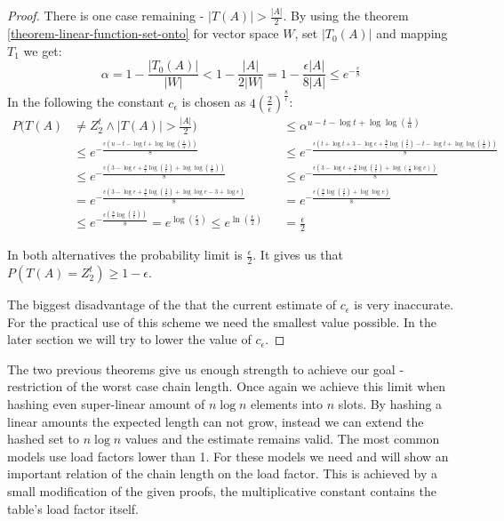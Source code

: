 \begin{proof}
There is one case remaining - $|T(A)| > \frac{|A|}{2}$. By using the theorem \ref{theorem-linear-function-set-onto} for vector space $W$, set $|T_0(A)|$ and mapping $T_1$ we get:
\begin{displaymath}
\alpha = 1 - \frac{|T_0(A)|}{|W|} < 1 - \frac{|A|}{2|W|} = 1 - \frac{\epsilon |A|}{8|A|} \leq e^{-\frac{\epsilon}{8}}
\end{displaymath}
In the following the constant $c_\epsilon$ is chosen as $4\left(\frac{2}{\epsilon}\right)^{\frac{8}{\epsilon}}$:
\begin{align*}
P(T(A) & \neq Z_2^t \wedge |T(A)| > \frac{|A|}{2}) && \leq \alpha ^ {u - t - \log t + \log\log\left(\frac{1}{\alpha}\right)} \\
    & \leq e^{-\frac{\epsilon\left(u - t - \log t + \log\log\left(\frac{1}{\alpha}\right)\right)}{8}} && \leq e^{-\frac{\epsilon\left(t + \log t + 3 - \log \epsilon + \frac{8}{\epsilon}\log\left(\frac{2}{\epsilon}\right) - t - \log t + \log\log\left(\frac{1}{\alpha}\right)\right)}{8}} \\
    & \leq e^{-\frac{\epsilon \left(3 - \log \epsilon + \frac{8}{\epsilon}\log\left(\frac{2}{\epsilon}\right) + \log\log\left(\frac{1}{\alpha}\right) \right)}{8}} && \leq e^{-\frac{\epsilon \left(3 - \log \epsilon + \frac{8}{\epsilon}\log\left(\frac{2}{\epsilon}\right) + \log\left(\frac{\epsilon}{8} \log e \right) \right)}{8}} \\
    & = e^{-\frac{\epsilon \left(3 - \log \epsilon + \frac{8}{\epsilon}\log\left(\frac{2}{\epsilon}\right) + \log\log e - 3 + \log \epsilon \right)}{8}} && = e^{-\frac{\epsilon \left( \frac{8}{\epsilon}\log\left(\frac{2}{\epsilon}\right) + \log\log e \right)}{8}} \\
    & \leq e^{-\frac{\epsilon \left( \frac{8}{\epsilon}\log\left(\frac{2}{\epsilon}\right) \right)}{8}} = e^{{\log\left(\frac{\epsilon}{2}\right)}} \leq e^{\ln\left(\frac{\epsilon}{2}\right)} && = \frac{\epsilon}{2}
\end{align*}

In both alternatives the probability limit is $\frac{\epsilon}{2}$. It gives us that $P(T(A) = Z_2^t) \geq 1 - \epsilon$.

The biggest disadvantage of the that the current estimate of $c_\epsilon$ is very inaccurate. For the practical use of this scheme we need the smallest value possible. In the later section we will try to lower the value of $c_\epsilon$.
\end{proof}

The two previous theorems give us enough strength to achieve our goal - restriction of the worst case chain length. Once again we achieve this limit when hashing even super-linear amount of $n \log n$ elements into $n$ slots. By hashing a linear amounts the expected length can not grow, instead we can extend the hashed set to $n \log n$ values and the estimate remains valid. The most common models use load factors lower than 1. For these models we need and will show an important relation of the chain length on the load factor. This is achieved by a small modification of the given proofs, the multiplicative constant contains the table's load factor itself.

